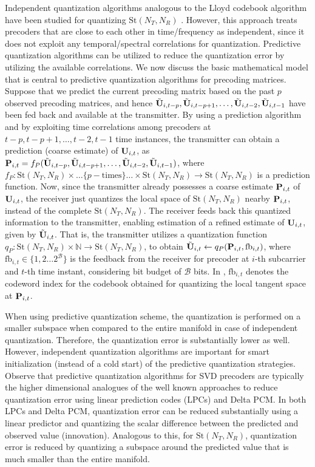 \documentclass[conference]{IEEEtran}
\begin{document}
Independent quantization algorithms analogous to the Lloyd codebook algorithm have been studied for quantizing $\text{St}(N_T,N_R)$ \cite{6678348}.
However, this approach treats precoders that are close to each other in time/frequency as independent, since it does not exploit any temporal/spectral correlations for quantization.
Predictive quantization algorithms \cite{Gupt1905:Predictive,6891198} can be utilized to reduce the quantization error by utilizing the available correlations. We now discuss the basic mathematical model that is central to predictive quantization algorithms for precoding matrices.
Suppose that we predict the current precoding matrix based on the past $p$ observed precoding matrices, and hence $\tilde{{\bf U}}_{i,t-p},\tilde{{\bf U}}_{i,t-p+1},\ldots,\tilde{{\bf U}}_{i,t-2},\tilde{{\bf U}}_{i,t-1}$ have been fed back and available at the transmitter.
By using a prediction algorithm and by exploiting time correlations among precoders at $t-p,t-p+1,\ldots,t-2,t-1$ time instances, the transmitter can obtain a prediction (coarse estimate) of ${\bf U}_{i,t}$, as ${\bf P}_{i,t}=f_P(\tilde{{\bf U}}_{i,t-p},\tilde{{\bf U}}_{i,t-p+1},\ldots,\tilde{{\bf U}}_{i,t-2},\tilde{{\bf U}}_{i,t-1})$, where $f_P: \text{St}(N_T,N_R)\times\ldots\{p-\text{times}\}\ldots\times\text{St}(N_T,N_R) \to \text{St}(N_T,N_R)$ is a prediction function.
Now, since the transmitter already possesses a coarse estimate ${\bf P}_{i,t}$ of ${\bf U}_{i,t}$, the receiver just quantizes the local space of $\text{St}(N_T,N_R)$ nearby ${\bf P}_{i,t}$, instead of the complete $\text{St}(N_T,N_R)$. The receiver feeds back this quantized information to the transmitter, enabling estimation of a refined estimate of ${\bf U}_{i,t}$, given by $\tilde{{\bf U}}_{i,t}$.
That is, the transmitter utilizes a quantization function $q_P:\text{St}(N_T,N_R) \times \mathbb{N} \to \text{St}(N_T,N_R)$, to obtain $\tilde{{\bf U}}_{i,t} \gets q_P({\bf P}_{i,t},\text{fb}_{i,t})$, where $\text{fb}_{i,t} \in \{1,2\ldots2^{\mathcal{B}}\}$ is the feedback from the receiver for precoder at $i$-th subcarrier and $t$-th time instant, considering bit budget of $\mathcal{B}$ bits.
In \cite{Gupt1905:Predictive,6891198,6545375}, $\text{fb}_{i,t}$ denotes the codeword index for the codebook obtained for quantizing the local tangent space at ${\bf P}_{i,t}$.

When using predictive quantization scheme, the quantization is performed on a smaller subspace when compared to the entire manifold in case of independent quantization.
Therefore, the quantization error is substantially lower as well.
However, independent quantization algorithms are important for smart initialization (instead of a cold start) of the predictive quantization strategies.
Observe that predictive quantization algorithms for SVD precoders are typically the higher dimensional analogues of the well known approaches to reduce quantization error using linear prediction codes (LPCs) and Delta PCM.
In both LPCs and Delta PCM, quantization error can be reduced substantially using a linear predictor and quantizing the scalar difference between the predicted and observed value (innovation).
Analogous to this, for $\text{St}(N_T,N_R)$, quantization error is reduced by quantizing a subspace around the predicted value that is much smaller than the entire manifold.
\end{document}
